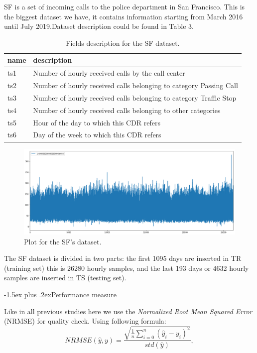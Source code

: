\documentclass[12pt,a4paper]{article}
\makeatletter
\renewcommand{\subsection}{\@startsection{subsection}{2}{18pt}{3.25ex plus 1ex minus 0.2ex}%
{-1.5ex plus .2ex}{\bfseries\rmfamily\large}}
\theoremstyle{myplain}
\numberwithin{equation}{section}
\makeatother
\begin{document}
SF is a set of incoming calls to the police department in San Francisco. This is the biggest dataset we have, it contains information starting from March 2016 until July 2019.Dataset description could be found in Table 3.
\begin{table}[h!]
\label{tab:table3}
\begin{tabular}{l|l}
name & description \\
\hline
ts1 & Number of hourly received calls by the call center \\
ts2 & Number of hourly received calls belonging to category Passing Call \\
ts3 & Number of hourly received calls belonging to category Traffic Stop \\
ts4 & Number of hourly received calls belonging to other categories \\
ts5 & Hour of the day to which this CDR refers \\
ts6 & Day of the week to which this CDR refers \\
\hline
\end{tabular}
\caption{Fields description for the SF dataset.}
\end{table}

\begin{figure}
\includegraphics[scale=0.36]{SF_data_plot}
\caption{Plot for the SF's dataset.}
\end{figure}

The SF dataset is divided in two parts: the first 1095 days are inserted in TR (training set) this is 26280 hourly samples, and the last 193 days or 4632 hourly samples are inserted in TS (testing set).

\subsection{Performance measure}

Like in all previous studies here we use the \textit{Normalized Root Mean Squared Error} (NRMSE) for quality check. Using following formula:
\begin{equation}
NRMSE(\widehat{y}, y) = \frac{\sqrt{\frac{1}{n} \sum_{i = 0}^n \left( \widehat{y}_i - y_i \right)^2}}{std(\widehat{y})},
\end{equation}
\end{document}
